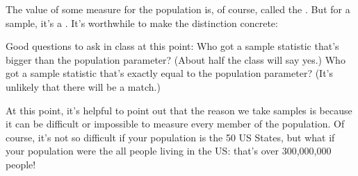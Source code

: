 The value of some measure for the population is, of course, called the 
.  
%
But for a sample, it's a .  It's
worthwhile to make the distinction concrete:
\begin{knitrout}
\end{knitrout}


Good questions to ask in class at this point: Who got a sample
statistic that's bigger than the population parameter?  (About half
the class will say yes.)  Who got a sample statistic that's exactly
equal to the population parameter?  (It's unlikely that there will be a match.)


At this point, it's helpful to point out that the reason we take
samples is because it can be difficult or impossible to measure every
member of the population.  Of course, it's not so difficult if your
population is the 50 US States, but what if your population were the
all people living in the US: that's over 300,000,000 people!  


